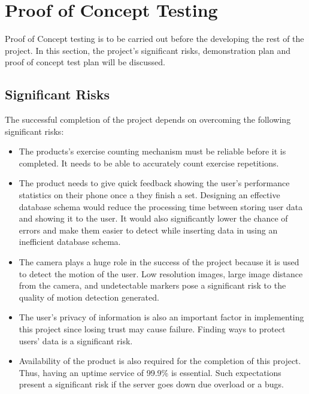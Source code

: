 \documentclass{article}
\begin{document}
\section{Proof of Concept Testing}
Proof of Concept testing is to be carried out before the developing the rest of the project. In this section, the project's significant risks, demonstration plan and proof of concept test plan will be discussed.

\subsection{Significant Risks}
The successful completion of the project depends on overcoming the following significant risks:
\begin{itemize}
    \item The products's exercise counting mechanism must be reliable before it is completed. It needs to be able to accurately count exercise repetitions.
    
    \item The product needs to give quick feedback showing the user's performance statistics on their phone once a they finish a set. Designing an effective database schema would reduce the processing time between storing user data and showing it to the user. It would also significantly lower the chance of errors and make them easier to detect while inserting data in using an inefficient database schema.
    
    \item The camera plays a huge role in the success of the project because it is used to detect the motion of the user. Low resolution images, large image distance from the camera, and undetectable markers pose a significant risk to the quality of motion detection generated.
    
    \item The user's privacy of information is also an important factor in implementing this project since losing trust may cause failure. Finding ways to protect users' data is a significant risk.
    
    \item Availability of the product is also required for the completion of this project. Thus, having an uptime service of 99.9\% is essential. Such expectations present a significant risk if the server goes down due overload or a bugs.
\end{itemize}
\end{document}
